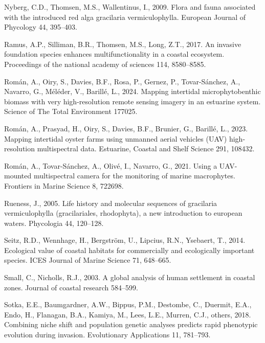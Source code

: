 \documentclass[
  letterpaper,
  DIV=11,
  numbers=noendperiod]{scrartcl}
\newlength{\cslhangindent}
\newenvironment{CSLReferences}[2] %
 {\begin{list}{}{%
  \setlength{\itemindent}{0pt}
  \setlength{\leftmargin}{0pt}
  \setlength{\parsep}{0pt}
  \ifodd #1
   \setlength{\leftmargin}{\cslhangindent}
   \setlength{\itemindent}{-1\cslhangindent}
  \fi
  \setlength{\itemsep}{#2\baselineskip}}}
 {\end{list}}
\begin{document}
\begin{CSLReferences}{1}{0}
Nyberg, C.D., Thomsen, M.S., Wallentinus, I., 2009. Flora and fauna
associated with the introduced red alga gracilaria vermiculophylla.
European Journal of Phycology 44, 395--403.

Ramus, A.P., Silliman, B.R., Thomsen, M.S., Long, Z.T., 2017. An
invasive foundation species enhances multifunctionality in a coastal
ecosystem. Proceedings of the national academy of sciences 114,
8580--8585.

Román, A., Oiry, S., Davies, B.F., Rosa, P., Gernez, P., Tovar-Sánchez,
A., Navarro, G., Méléder, V., Barillé, L., 2024. Mapping intertidal
microphytobenthic biomass with very high-resolution remote sensing
imagery in an estuarine system. Science of The Total Environment 177025.

Román, A., Prasyad, H., Oiry, S., Davies, B.F., Brunier, G., Barillé,
L., 2023. Mapping intertidal oyster farms using unmanned aerial vehicles
(UAV) high-resolution multispectral data. Estuarine, Coastal and Shelf
Science 291, 108432.

Román, A., Tovar-Sánchez, A., Olivé, I., Navarro, G., 2021. Using a
UAV-mounted multispectral camera for the monitoring of marine
macrophytes. Frontiers in Marine Science 8, 722698.

Rueness, J., 2005. Life history and molecular sequences of gracilaria
vermiculophylla (gracilariales, rhodophyta), a new introduction to
european waters. Phycologia 44, 120--128.

Seitz, R.D., Wennhage, H., Bergström, U., Lipcius, R.N., Ysebaert, T.,
2014. Ecological value of coastal habitats for commercially and
ecologically important species. ICES Journal of Marine Science 71,
648--665.

Small, C., Nicholls, R.J., 2003. A global analysis of human settlement
in coastal zones. Journal of coastal research 584--599.

Sotka, E.E., Baumgardner, A.W., Bippus, P.M., Destombe, C., Duermit,
E.A., Endo, H., Flanagan, B.A., Kamiya, M., Lees, L.E., Murren, C.J.,
others, 2018. Combining niche shift and population genetic analyses
predicts rapid phenotypic evolution during invasion. Evolutionary
Applications 11, 781--793.


\end{CSLReferences}
\end{document}
